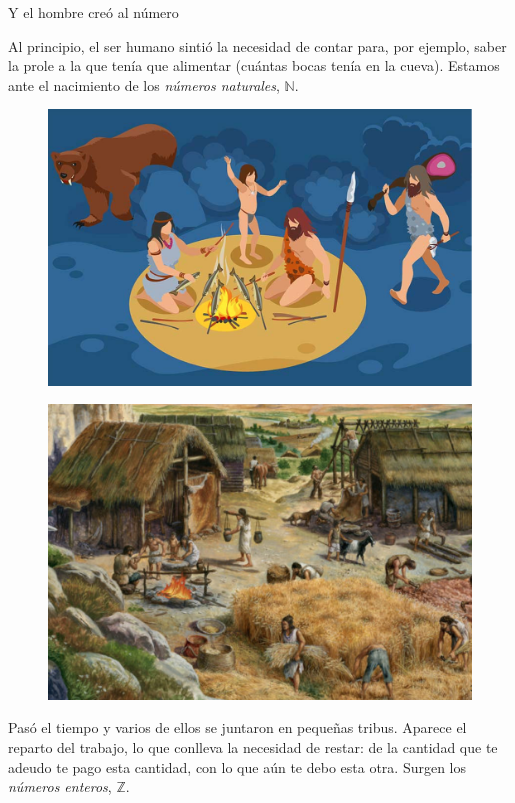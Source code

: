 \begin{adjustwidth}{25pt}{25pt}

\begin{myexampleblock}{Y el hombre creó al número}
	
\vspace{3mm} 
\begin{multicols}{2}
Al principio, el ser humano sintió la necesidad de contar para, por ejemplo, saber la prole a la que tenía que alimentar (cuántas bocas tenía en la cueva). Estamos ante el nacimiento de los \emph{números naturales}, $\mathbb N$.
\begin{figure}[H]
	\centering
	\includegraphics[width=.4\textwidth]{img-reales/reales01.png}	
\end{figure}
\end{multicols}

\vspace{3mm} 
\begin{multicols}{2}
\begin{figure}[H]
	\centering
	\includegraphics[width=.4\textwidth]{img-reales/reales02.png}	
\end{figure}
Pasó el tiempo y varios de ellos se juntaron en pequeñas tribus. Aparece el reparto del trabajo, lo que  conlleva la necesidad de restar: de la cantidad que te adeudo te pago esta cantidad, con lo que aún te debo esta otra. Surgen los \emph{números enteros}, $\mathbb Z$.
\end{multicols}	


\end{myexampleblock}
\end{adjustwidth}
